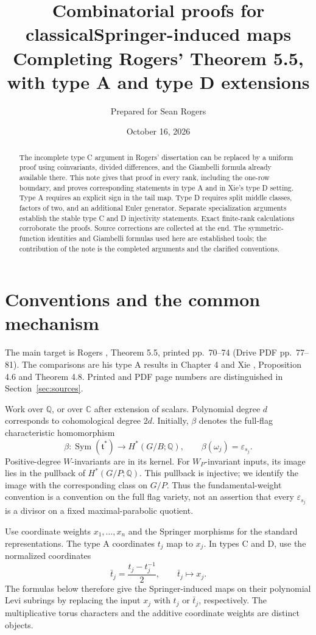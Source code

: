 \documentclass[11pt,letterpaper]{article}
\title{\vspace{-1.5em}Combinatorial proofs for classical\newline Springer-induced maps\\[5pt]
\large Completing Rogers' Theorem 5.5, with type A and type D extensions}
\author{Prepared for Sean Rogers}
\date{October 16, 2026}
\theoremstyle{remark}
\newcommand{\eps}{\varepsilon}
\newcommand{\Sym}{\operatorname{Sym}}
\newcommand{\C}{\mathbb C}
\newcommand{\Q}{\mathbb Q}
\begin{document}
\maketitle
\vspace{-1.2em}
\begin{abstract}
The incomplete type C argument in Rogers' dissertation can be replaced by a uniform proof using coinvariants, divided differences, and the Giambelli formula already available there. This note gives that proof in every rank, including the one-row boundary, and proves corresponding statements in type A and in Xie's type D setting. Type A requires an explicit sign in the tail map. Type D requires split middle classes, factors of two, and an additional Euler generator. Separate specialization arguments establish the stable type C and D injectivity statements. Exact finite-rank calculations corroborate the proofs. Source corrections are collected at the end. The symmetric-function identities and Giambelli formulas used here are established tools; the contribution of the note is the completed arguments and the clarified conventions.
\end{abstract}

\section{Conventions and the common mechanism}
\label{sec:setup}

The main target is Rogers \cite{Rogers}, Theorem 5.5, printed pp.~70--74 (Drive PDF pp.~77--81). The comparisons are his type A results in Chapter 4 and Xie \cite{Xie}, Proposition 4.6 and Theorem 4.8. Printed and PDF page numbers are distinguished in Section~\ref{sec:sources}.

Work over $\Q$, or over $\C$ after extension of scalars. Polynomial degree $d$ corresponds to cohomological degree $2d$. Initially, $\beta$ denotes the full-flag characteristic homomorphism
\[
 \beta:\Sym(\mathfrak t^*)\longrightarrow H^*(G/B;\Q),
 \qquad \beta(\omega_j)=\eps_{s_j}.
\]
Positive-degree $W$-invariants are in its kernel. For $W_P$-invariant inputs, its image lies in the pullback of $H^*(G/P;\Q)$. This pullback is injective; we identify the image with the corresponding class on $G/P$. Thus the fundamental-weight convention is a convention on the full flag variety, not an assertion that every $\eps_{s_j}$ is a divisor on a fixed maximal-parabolic quotient.

Use coordinate weights $x_1,\ldots,x_n$ and the Springer morphisms for the standard representations. The type A coordinates $t_j$ map to $x_j$. In types C and D, use the normalized coordinates
\[
 \bar t_j=\frac{t_j-t_j^{-1}}2,\qquad \bar t_j\longmapsto x_j.
\]
The formulas below therefore give the Springer-induced maps on their polynomial Levi subrings by replacing the input $x_j$ with $t_j$ or $\bar t_j$, respectively. The multiplicative torus characters and the additive coordinate weights are distinct objects.
\end{document}
